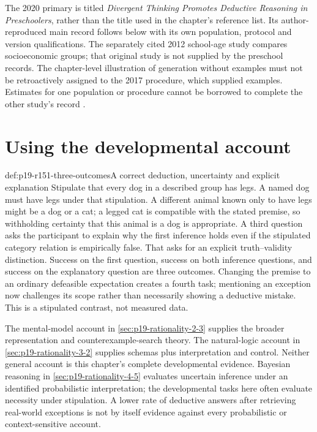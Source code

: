The 2020 primary is titled \emph{Divergent Thinking Promotes Deductive
Reasoning in Preschoolers}, rather than the title used in the chapter's
reference list. Its author-reproduced main record follows below with its
own population, protocol and version qualifications. The separately cited
2012 school-age study compares socioeconomic groups; that original study
is not supplied by the preschool records. The chapter-level illustration of
generation without examples must not be retroactively assigned to the 2017
procedure, which supplied examples. Estimates for one population or procedure
cannot be borrowed to complete the other study's record
\cite[pp.~786--789]{Markovits2021DevelopmentRationality}
\cite{DeChantalGagnonMarkovits2020PreschoolMetadata}.



\section{Using the developmental account}
\label{sec:p19-r151-use}

\begin{hbexample}{def:p19-r151-three-outcomes}{A correct deduction, uncertainty and explicit explanation}
Stipulate that every dog in a described group has legs. A named dog must have
legs under that stipulation. A different animal known only to have legs might
be a dog or a cat; a legged cat is compatible with the stated premise, so
withholding certainty that this animal is a dog is appropriate. A third question asks the
participant to explain why the first inference holds even if the stipulated
category relation is empirically false. That asks for an explicit
truth--validity distinction. Success on the first question, success on both
inference questions, and success on the explanatory question are three outcomes.
Changing the premise to an ordinary defeasible expectation creates a fourth
task; mentioning an exception now challenges its scope rather than necessarily
showing a deductive mistake. This is a stipulated contrast, not measured data.
\end{hbexample}

The mental-model account in \cref{sec:p19-rationality-2-3} supplies the broader
representation and counterexample-search theory. The natural-logic account in
\cref{sec:p19-rationality-3-2} supplies schemas plus interpretation and control.
Neither general account is this chapter's complete developmental evidence.
Bayesian reasoning in \cref{sec:p19-rationality-4-5} evaluates uncertain
inference under an identified probabilistic interpretation; the developmental
tasks here often evaluate necessity under stipulation. A lower rate of
deductive answers after retrieving real-world exceptions is not by itself
evidence against every probabilistic or context-sensitive account.

